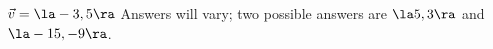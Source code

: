 {$\vec v = \la -3,5\ra$
}
{Answers will vary; two possible answers are $\la 5,3\ra$ and $\la -15,-9\ra$.
}
